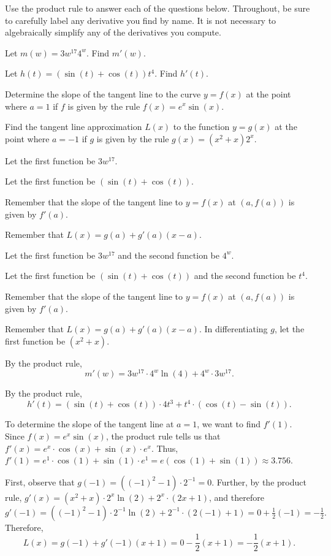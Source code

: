 \begin{activity} \label{A:2.3.1}  Use the product rule to answer each of the questions below.  Throughout, be sure to carefully label any derivative you find by name.  It is not necessary to algebraically simplify any of the derivatives you compute.
\ba
	\item Let $m(w)=3w^{17} 4^w$.  Find $m'(w)$.
	\item Let $h(t) = (\sin(t) + \cos(t))t^4$.  Find $h'(t)$.
	\item Determine the slope of the tangent line to the curve $y = f(x)$ at the point where $a = 1$ if $f$ is given by the rule $f(x) = e^x \sin(x)$.
	\item Find the tangent line approximation $L(x)$ to the function $y = g(x)$ at the point where $a = -1$ if $g$ is given by the rule $g(x) = (x^2 + x) 2^x$.
\ea

\end{activity}
\begin{smallhint}
\ba
	\item Let the first function be $3w^{17}$.
	\item Let the first function be $(\sin(t) + \cos(t))$.
	\item Remember that the slope of the tangent line to $y = f(x)$ at $(a,f(a))$ is given by $f'(a)$.
	\item Remember that $L(x) = g(a) + g'(a)(x-a).$
\ea
\end{smallhint}
\begin{bighint}
\ba
	\item Let the first function be $3w^{17}$ and the second function be $4^w$.
	\item Let the first function be $(\sin(t) + \cos(t))$ and the second function be $t^4$.
	\item Remember that the slope of the tangent line to $y = f(x)$ at $(a,f(a))$ is given by $f'(a)$.
	\item Remember that $L(x) = g(a) + g'(a)(x-a).$  In differentiating $g$, let the first function be $(x^2 + x)$.
\ea
\end{bighint}
\begin{activitySolution}
\ba
	\item By the product rule, 
	$$m'(w) = 3w^{17} \cdot 4^w \ln(4) + 4^w \cdot 3w^17.$$ 
	\item By the product rule, 
	$$h'(t) = (\sin(t) + \cos(t)) \cdot 4t^3 + t^4 \cdot (\cos(t) - \sin(t)).$$ 
	\item To determine the slope of the tangent line at $a = 1$, we want to find $f'(1)$.  Since $f(x) = e^x \sin(x)$, the product rule tells us that $f'(x) = e^x \cdot \cos(x) + \sin(x) \cdot e^x$.  Thus, $f'(1) = e^1 \cdot \cos(1) + \sin(1) \cdot e^1 = e(\cos(1) + \sin(1)) \approx 3.756$.
	\item First, observe that $g(-1) = ((-1)^2 - 1) \cdot 2^{-1} = 0$.  Further, by the product rule, $g'(x) = (x^2 + x) \cdot 2^x \ln(2) + 2^x \cdot (2x + 1)$, and therefore $g'(-1) = ((-1)^2 - 1) \cdot 2^{-1} \ln(2) + 2^{-1} \cdot (2(-1) + 1) = 0 + \frac{1}{2}(-1) = -\frac{1}{2}.$  Therefore,
	$$L(x) = g(-1) + g'(-1)(x+1) = 0 - \frac{1}{2}(x+1) = -\frac{1}{2}(x+1).$$
\ea
\end{activitySolution}
\aftera